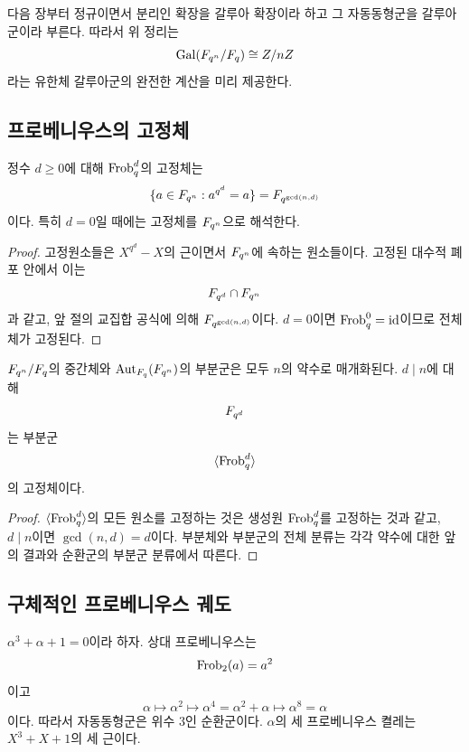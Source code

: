 \begin{remark}
다음 장부터 정규이면서 분리인 확장을 갈루아 확장이라 하고 그 자동동형군을 갈루아군이라 부른다. 따라서 위 정리는
\[
  \operatorname{Gal}(F_{q^n}/F_q)\cong Z/nZ
\]
라는 유한체 갈루아군의 완전한 계산을 미리 제공한다.
\end{remark}

\subsection{프로베니우스의 고정체}

\begin{proposition}
정수 $d\ge0$에 대해 $\operatorname{Frob}_q^d$의 고정체는
\[
  \{a\in F_{q^n}:a^{q^d}=a\}
  =F_{q^{\gcd(n,d)}}
\]
이다. 특히 $d=0$일 때에는 고정체를 $F_{q^n}$으로 해석한다.
\end{proposition}

\begin{proof}
고정원소들은 $X^{q^d}-X$의 근이면서 $F_{q^n}$에 속하는 원소들이다. 고정된 대수적 폐포 안에서 이는
\[
  F_{q^d}\cap F_{q^n}
\]
과 같고, 앞 절의 교집합 공식에 의해 $F_{q^{\gcd(n,d)}}$이다. $d=0$이면 $\operatorname{Frob}_q^0=\operatorname{id}$이므로 전체 체가 고정된다.
\end{proof}

\begin{corollary}
$F_{q^n}/F_q$의 중간체와 $\operatorname{Aut}_{F_q}(F_{q^n})$의 부분군은 모두 $n$의 약수로 매개화된다. $d\mid n$에 대해
\[
  F_{q^d}
\]
는 부분군
\[
  \langle\operatorname{Frob}_q^d\rangle
\]
의 고정체이다.
\end{corollary}

\begin{proof}
$\langle\operatorname{Frob}_q^d\rangle$의 모든 원소를 고정하는 것은 생성원 $\operatorname{Frob}_q^d$를 고정하는 것과 같고, $d\mid n$이면 $\gcd(n,d)=d$이다. 부분체와 부분군의 전체 분류는 각각 약수에 대한 앞의 결과와 순환군의 부분군 분류에서 따른다.
\end{proof}

\subsection{구체적인 프로베니우스 궤도}

\begin{example}[$\F_8/\F_2$]
$\alpha^3+\alpha+1=0$이라 하자. 상대 프로베니우스는
\[
  \operatorname{Frob}_2(a)=a^2
\]
이고
\[
  \alpha\longmapsto\alpha^2
  \longmapsto\alpha^4=\alpha^2+\alpha
  \longmapsto\alpha^8=\alpha
\]
이다. 따라서 자동동형군은 위수 $3$인 순환군이다. $\alpha$의 세 프로베니우스 켤레는 $X^3+X+1$의 세 근이다.
\end{example}

